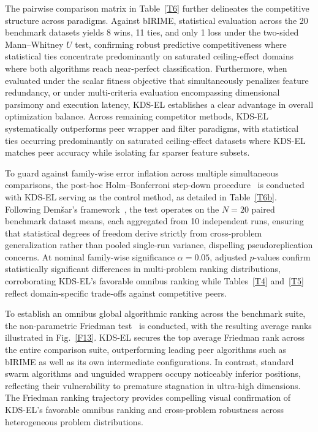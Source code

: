 The pairwise comparison matrix in Table~\ref{T6} further delineates the competitive structure across paradigms. Against bIRIME, statistical evaluation across the 20 benchmark datasets yields 8 wins, 11 ties, and only 1 loss under the two-sided Mann--Whitney $U$ test, confirming robust predictive competitiveness where statistical ties concentrate predominantly on saturated ceiling-effect domains where both algorithms reach near-perfect classification. Furthermore, when evaluated under the scalar fitness objective that simultaneously penalizes feature redundancy, or under multi-criteria evaluation encompassing dimensional parsimony and execution latency, KDS-EL establishes a clear advantage in overall optimization balance. Across remaining competitor methods, KDS-EL systematically outperforms peer wrapper and filter paradigms, with statistical ties occurring predominantly on saturated ceiling-effect datasets where KDS-EL matches peer accuracy while isolating far sparser feature subsets.



To guard against family-wise error inflation across multiple simultaneous comparisons, the post-hoc Holm--Bonferroni step-down procedure~\cite{holm1979} is conducted with KDS-EL serving as the control method, as detailed in Table~\ref{T6b}. Following Dem{\v{s}}ar's framework~\cite{demsar2006}, the test operates on the $N=20$ paired benchmark dataset means, each aggregated from 10 independent runs, ensuring that statistical degrees of freedom derive strictly from cross-problem generalization rather than pooled single-run variance, dispelling pseudoreplication concerns. At nominal family-wise significance $\alpha = 0.05$, adjusted $p$-values confirm statistically significant differences in multi-problem ranking distributions, corroborating KDS-EL's favorable omnibus ranking while Tables~\ref{T4} and~\ref{T5} reflect domain-specific trade-offs against competitive peers.



To establish an omnibus global algorithmic ranking across the benchmark suite, the non-parametric Friedman test~\cite{friedman1940} is conducted, with the resulting average ranks illustrated in Fig.~\ref{F13}. KDS-EL secures the top average Friedman rank across the entire comparison suite, outperforming leading peer algorithms such as bIRIME as well as its own intermediate configurations. In contrast, standard swarm algorithms and unguided wrappers occupy noticeably inferior positions, reflecting their vulnerability to premature stagnation in ultra-high dimensions. The Friedman ranking trajectory provides compelling visual confirmation of KDS-EL's favorable omnibus ranking and cross-problem robustness across heterogeneous problem distributions.


